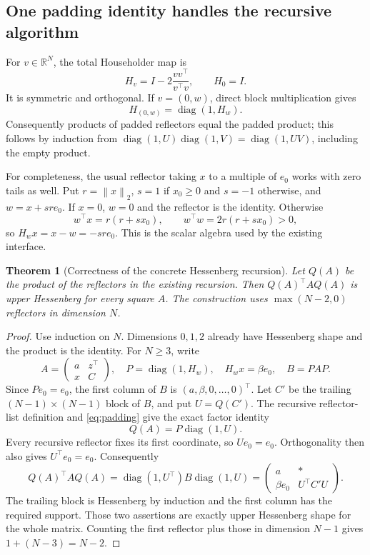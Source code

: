 \documentclass[11pt]{article}
\newcommand{\R}{\mathbb R}
\newcommand{\norm}[1]{\left\lVert#1\right\rVert}
\newcommand{\diag}{\operatorname{diag}}
\newcommand{\code}[1]{\ifmmode\text{\small\nolinkurl{#1}}\else{\small\nolinkurl{#1}}\fi}
\newtheorem{theorem}{Theorem}[section]
\theoremstyle{remark}\newtheorem{remark}[theorem]{Remark}
\numberwithin{equation}{section}
\begin{document}
\subsection{One padding identity handles the recursive algorithm}
For $v\in\R^N$, the total Householder map is
\[
 H_v=I-2\frac{vv^\top}{v^\top v},\qquad H_0=I.
\]
It is symmetric and orthogonal. If $v=(0,w)$, direct block multiplication
gives
\begin{equation}\label{eq:padding}
 H_{(0,w)}=\diag(1,H_w).
\end{equation}
Consequently products of padded reflectors equal the padded product;
this follows by induction from
$\diag(1,U)\diag(1,V)=\diag(1,UV)$, including the empty product.

For completeness, the usual reflector taking $x$ to a multiple of $e_0$
works with zero tails as well. Put $r=\norm x_2$,
$s=1$ if $x_0\ge0$ and $s=-1$ otherwise, and $w=x+sr e_0$.
If $x=0$, $w=0$ and the reflector is the identity. Otherwise
\[
 w^\top x=r(r+sx_0),\qquad w^\top w=2r(r+sx_0)>0,
\]
so $H_wx=x-w=-sr e_0$. This is the scalar algebra used by the
existing \code{householderVector} interface.

\begin{theorem}[Correctness of the concrete Hessenberg recursion]
Let $Q(A)$ be the product of the reflectors in the existing recursion.
Then $Q(A)^\top A Q(A)$ is upper Hessenberg for every square $A$.
The construction uses $\max(N-2,0)$ reflectors in dimension $N$.
\end{theorem}
\begin{proof}
Use induction on $N$. Dimensions $0,1,2$ already have Hessenberg shape
and the product is the identity. For $N\ge3$, write
\[
 A=\begin{pmatrix}a&z^\top\\x&C\end{pmatrix},\quad
 P=\diag(1,H_w),\quad H_wx=\beta e_0,\quad B=PAP.
\]
Since $Pe_0=e_0$, the first column of $B$ is
$(a,\beta,0,\ldots,0)^\top$. Let $C'$ be the trailing $(N-1)\times(N-1)$
block of $B$, and put $U=Q(C')$. The recursive reflector-list definition
and \eqref{eq:padding} give the exact factor identity
\begin{equation}\label{eq:hessrec}
 Q(A)=P\diag(1,U).
\end{equation}
Every recursive reflector fixes its first coordinate, so $Ue_0=e_0$.
Orthogonality then also gives $U^\top e_0=e_0$. Consequently
\[
 Q(A)^\top A Q(A)
 =\diag(1,U^\top)B\diag(1,U)
 =\begin{pmatrix}a&*\\\beta e_0&U^\top C'U\end{pmatrix}.
\]
The trailing block is Hessenberg by induction and the first column has
the required support. Those two assertions are exactly upper Hessenberg
shape for the whole matrix. Counting the first reflector plus those in
dimension $N-1$ gives $1+(N-3)=N-2$.
\end{proof}
\end{document}
